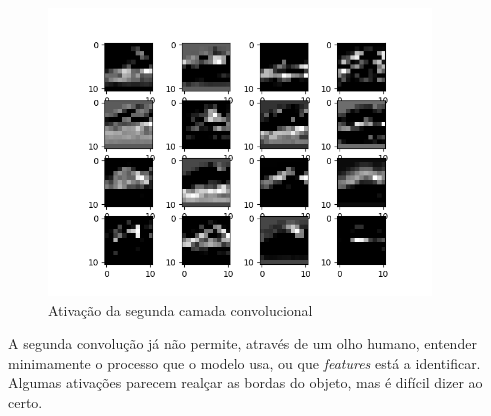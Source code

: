 \documentclass[a4paper,2pt]{report}
\begin{document}
    \begin{figure}[H]
        \centering
        \includegraphics[width=4in]{activ_layer3.png}
        \caption{Ativação da segunda camada convolucional}
    \end{figure}

    \par A segunda convolução já não permite, através de um olho humano, entender minimamente o processo que o modelo usa, ou que \textit{features} está a identificar. Algumas ativações parecem realçar as bordas do objeto, mas é difícil dizer ao certo.
\end{document}
